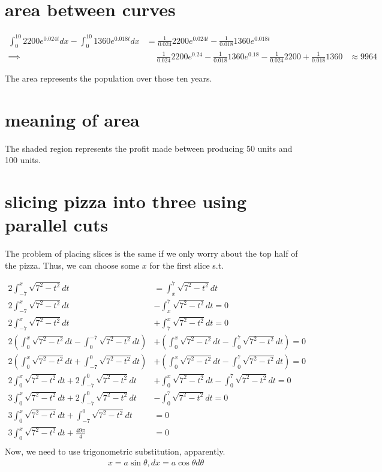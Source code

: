\documentclass[letterpaper]{article}
\begin{document}
\section{area between curves}
\label{sec:orgaf6b83d}

\[\begin{aligned}
  \int_{0}^{10} 2200e^{0.024t} dx - \int_0^{10} 1360e^{0.018t} dx &= \frac{1}{0.024} 2200e^{0.024t} - \frac{1}{0.018} 1360e^{0.018t}\\
  \implies &\quad \ \frac{1}{0.024} 2200e^{0.24} - \frac{1}{0.018} 1360e^{0.18} - \frac{1}{0.024} 2200 + \frac{1}{0.018} 1360
  &\approx  9964
  \end{aligned}\]

The area represents the population over those ten years.

\section{meaning of area}
\label{sec:orgbc3114e}
The shaded region represents the profit made between producing 50 units and 100 units.

\section{slicing pizza into three using parallel cuts}
\label{sec:org37bebb8}
The problem of placing slices is the same if we only worry about the top half of the pizza. Thus, we can choose some \(x\) for the first slice s.t.

\[\begin{aligned}
  2\int_{-7}^{x} \sqrt{7^2 - t^2} dt &= \int_{x}^{7} \sqrt{7^2 - t^2} dt\\
  2\int_{-7}^{x} \sqrt{7^2 - t^2} dt &- \int_{x}^{7} \sqrt{7^2 - t^2} dt = 0\\
  2\int_{-7}^{x} \sqrt{7^2 - t^2} dt &+ \int_{7}^{x} \sqrt{7^2 - t^2} dt = 0\\
  2\left( \int_{0}^{x} \sqrt{7^2 - t^2} dt - \int_{0}^{-7} \sqrt{7^2 - t^2} dt \right)  &+\left( \int_{0}^{x} \sqrt{7^2 - t^2} dt - \int_{0}^{7} \sqrt{7^2 - t^2} dt \right)  = 0\\
  2\left( \int_{0}^{x} \sqrt{7^2 - t^2} dt + \int_{-7}^{0} \sqrt{7^2 - t^2} dt \right)  &+\left( \int_{0}^{x} \sqrt{7^2 - t^2} dt - \int_{0}^{7} \sqrt{7^2 - t^2} dt \right)  = 0\\
  2\int_{0}^{x} \sqrt{7^2 - t^2} dt + 2\int_{-7}^{0} \sqrt{7^2 - t^2} dt  &+\int_{0}^{x} \sqrt{7^2 - t^2} dt - \int_{0}^{7} \sqrt{7^2 - t^2} dt = 0\\
  3\int_{0}^{x} \sqrt{7^2 - t^2} dt + 2\int_{-7}^{0} \sqrt{7^2 - t^2} dt  &- \int_{0}^{7} \sqrt{7^2 - t^2} dt = 0\\
  3\int_{0}^{x} \sqrt{7^2 - t^2} dt + \int_{-7}^{0} \sqrt{7^2 - t^2} dt &= 0\\
  3\int_{0}^{x} \sqrt{7^2 - t^2} dt + \frac{49\pi}{4}  &= 0\\
  \end{aligned}\]
Now, we need to use trigonometric substitution, apparently.
\[\begin{aligned}
  x = a \sin \theta, dx = a \cos  \theta d \theta
  \end{aligned}\]
\end{document}
